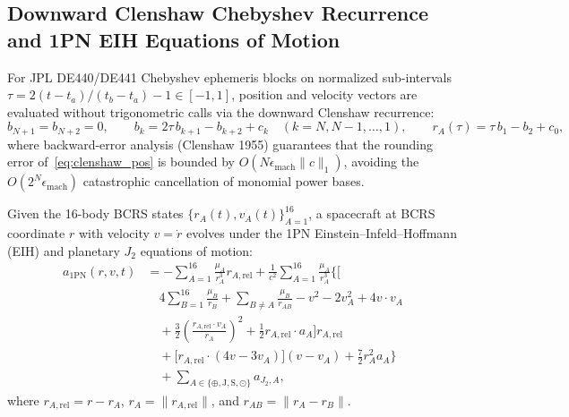 \documentclass[11pt,a4paper,reqno]{article}
\def\bm#1{#1}%
\def\mathcal#1{#1}%
\theoremstyle{plain}
\theoremstyle{definition}
\theoremstyle{remark}
\numberwithin{equation}{section}
\begin{document}
\subsection{Downward Clenshaw Chebyshev Recurrence and 1PN EIH Equations of Motion}
For JPL DE440/DE441 Chebyshev ephemeris blocks on normalized sub-intervals $\tau = 2(t - t_a)/(t_b - t_a) - 1 \in [-1, 1]$, position and velocity vectors are evaluated without trigonometric calls via the downward Clenshaw recurrence:
\begin{equation}
  \bm{b}_{N+1} = \bm{b}_{N+2} = \bm{0}, \qquad \bm{b}_k = 2\tau\,\bm{b}_{k+1} - \bm{b}_{k+2} + \bm{c}_k \quad (k = N, N-1, \dots, 1), \qquad \bm{r}_A(\tau) = \tau\,\bm{b}_1 - \bm{b}_2 + \bm{c}_0,
  \label{eq:clenshaw_pos}
\end{equation}
where backward-error analysis (Clenshaw 1955) guarantees that the rounding error of~\eqref{eq:clenshaw_pos} is bounded by $\mathcal{O}(N \epsilon_{\text{mach}} \|\bm{c}\|_1)$, avoiding the $\mathcal{O}(2^N \epsilon_{\text{mach}})$ catastrophic cancellation of monomial power bases.

Given the 16-body BCRS states $\{\bm{r}_A(t), \bm{v}_A(t)\}_{A=1}^{16}$, a spacecraft at BCRS coordinate $\bm{r}$ with velocity $\bm{v} = \dot{\bm{r}}$ evolves under the 1PN Einstein--Infeld--Hoffmann (EIH) and planetary $J_2$ equations of motion:
\begin{align}
  \bm{a}_{\text{1PN}}(\bm{r}, \bm{v}, t) &= -\sum_{A=1}^{16} \frac{\mu_A}{r_A^3}\bm{r}_{A,\text{rel}} + \frac{1}{c^2}\sum_{A=1}^{16} \frac{\mu_A}{r_A^3} \Bigg\{ \Bigg[ \nonumber \\
  &\quad 4\sum_{B=1}^{16}\frac{\mu_B}{r_B} + \sum_{B \ne A}\frac{\mu_B}{r_{AB}} - v^2 - 2v_A^2 + 4\bm{v}\cdot\bm{v}_A \nonumber \\
  &\quad + \frac{3}{2}\left(\frac{\bm{r}_{A,\text{rel}}\cdot\bm{v}_A}{r_A}\right)^2 + \frac{1}{2}\bm{r}_{A,\text{rel}}\cdot\bm{a}_A \Bigg]\bm{r}_{A,\text{rel}} \nonumber \\
  &\quad + \big[\bm{r}_{A,\text{rel}}\cdot(4\bm{v} - 3\bm{v}_A)\big](\bm{v} - \bm{v}_A) + \frac{7}{2}r_A^2\bm{a}_A \Bigg\} \nonumber \\
  &\quad + \sum_{A \in \{\oplus,\text{J},\text{S},\odot\}} \bm{a}_{J_2,A},
  \label{eq:eih_16body}
\end{align}
where $\bm{r}_{A,\text{rel}} = \bm{r} - \bm{r}_A$, $r_A = \|\bm{r}_{A,\text{rel}}\|$, and $r_{AB} = \|\bm{r}_A - \bm{r}_B\|$.
\end{document}
